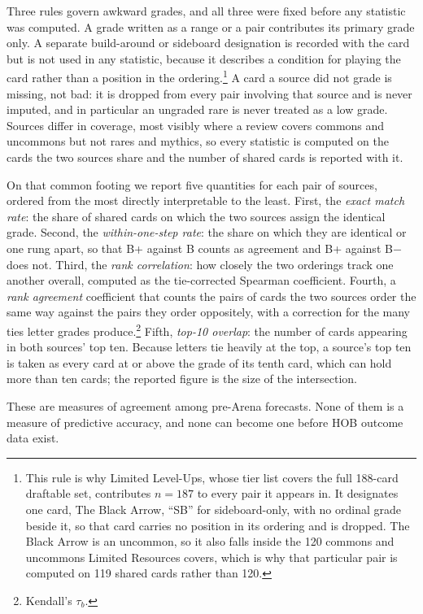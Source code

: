 \documentclass[11pt]{article}
\numberwithin{equation}{section}
\begin{document}
Three rules govern awkward grades, and all three were fixed before any statistic
was computed. A grade written as a range or a pair contributes its primary grade
only. A separate build-around or sideboard designation is recorded with the card
but is not used in any statistic, because it describes a condition for playing
the card rather than a position in the ordering.\footnote{This rule is why
Limited Level-Ups, whose tier list covers the full 188-card draftable set,
contributes $n=187$ to every pair it appears in. It designates one card, The
Black Arrow, ``SB'' for sideboard-only, with no ordinal grade beside it, so that
card carries no position in its ordering and is dropped. The Black Arrow is an
uncommon, so it also falls inside the 120 commons and uncommons Limited
Resources covers, which is why that particular pair is computed on 119 shared
cards rather than 120.} A card a source did not grade is
missing, not bad: it is dropped from every pair involving that source and is
never imputed, and in particular an ungraded rare is never treated as a low
grade. Sources differ in coverage, most visibly where a review covers commons and
uncommons but not rares and mythics, so every statistic is computed on the cards
the two sources share and the number of shared cards is reported with it.

On that common footing we report five quantities for each pair of sources,
ordered from the most directly interpretable to the least. First, the
\emph{exact match rate}: the share of shared cards on which the two sources
assign the identical grade. Second, the \emph{within-one-step rate}: the share on
which they are identical or one rung apart, so that B+ against B counts as
agreement and B+ against B$-$ does not. Third, the \emph{rank correlation}: how
closely the two orderings track one another overall, computed as the
tie-corrected Spearman coefficient. Fourth, a \emph{rank agreement} coefficient
that counts the pairs of cards the two sources order the same way against the
pairs they order oppositely, with a correction for the many ties letter grades
produce.\footnote{Kendall's $\tau_b$.} Fifth, \emph{top-10 overlap}: the number
of cards appearing in both sources' top ten. Because letters tie heavily at the
top, a source's top ten is taken as every card at or above the grade of its tenth
card, which can hold more than ten cards; the reported figure is the size of the
intersection.

These are measures of agreement among pre-Arena forecasts. None of them is a
measure of predictive accuracy, and none can become one before HOB outcome data
exist.
\end{document}

